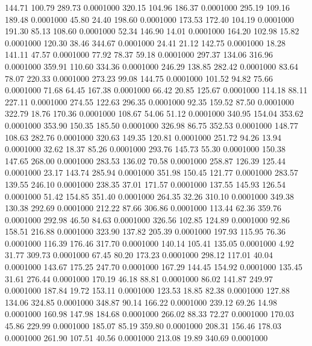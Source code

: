  144.71  100.79  289.73   0.0001000
 320.15  104.96  186.37   0.0001000
 295.19  109.16  189.48   0.0001000
  45.80   24.40  198.60   0.0001000
 173.53  172.40  104.19   0.0001000
 191.30   85.13  108.60   0.0001000
  52.34  146.90   14.01   0.0001000
 164.20  102.98   15.82   0.0001000
 120.30   38.46  344.67   0.0001000
  24.41   21.12  142.75   0.0001000
  18.28  141.11   47.57   0.0001000
  77.92   78.37   59.18   0.0001000
 297.37  134.06  316.96   0.0001000
 359.91  110.60  334.36   0.0001000
 246.29  138.85  282.42   0.0001000
  83.64   78.07  220.33   0.0001000
 273.23   99.08  144.75   0.0001000
 101.52   94.82   75.66   0.0001000
  71.68   64.45  167.38   0.0001000
  66.42   20.85  125.67   0.0001000
 114.18   88.11  227.11   0.0001000
 274.55  122.63  296.35   0.0001000
  92.35  159.52   87.50   0.0001000
 322.79   18.76  170.36   0.0001000
 108.67   54.06   51.12   0.0001000
 340.95  154.04  353.62   0.0001000
 353.90  150.35  185.50   0.0001000
 326.98   86.75  352.53   0.0001000
 148.77  108.63  282.76   0.0001000
 320.63  149.35  120.81   0.0001000
 251.72   94.26   13.94   0.0001000
  32.62   18.37   85.26   0.0001000
 293.76  145.73   55.30   0.0001000
 150.38  147.65  268.00   0.0001000
 283.53  136.02   70.58   0.0001000
 258.87  126.39  125.44   0.0001000
  23.17  143.74  285.94   0.0001000
 351.98  150.45  121.77   0.0001000
 283.57  139.55  246.10   0.0001000
 238.35   37.01  171.57   0.0001000
 137.55  145.93  126.54   0.0001000
  51.42  154.85  351.40   0.0001000
 264.35   32.26  310.10   0.0001000
 349.38  130.38  292.69   0.0001000
 212.22   87.66  306.86   0.0001000
 113.44   62.36  359.76   0.0001000
 292.98   46.50   84.63   0.0001000
 326.56  102.85  124.89   0.0001000
  92.86  158.51  216.88   0.0001000
 323.90  137.82  205.39   0.0001000
 197.93  115.95   76.36   0.0001000
 116.39  176.46  317.70   0.0001000
 140.14  105.41  135.05   0.0001000
   4.92   31.77  309.73   0.0001000
  67.45   80.20  173.23   0.0001000
 298.12  117.01   40.04   0.0001000
 143.67  175.25  247.70   0.0001000
 167.29  144.45  154.92   0.0001000
 135.45   31.61  276.44   0.0001000
 170.19   46.18   88.81   0.0001000
  86.02  141.87  249.97   0.0001000
 187.84   19.72  153.11   0.0001000
 123.53   18.85   82.38   0.0001000
 127.88  134.06  324.85   0.0001000
 348.87   90.14  166.22   0.0001000
 239.12   69.26   14.98   0.0001000
 160.98  147.98  184.68   0.0001000
 266.02   88.33   72.27   0.0001000
 170.03   45.86  229.99   0.0001000
 185.07   85.19  359.80   0.0001000
 208.31  156.46  178.03   0.0001000
 261.90  107.51   40.56   0.0001000
 213.08   19.89  340.69   0.0001000
